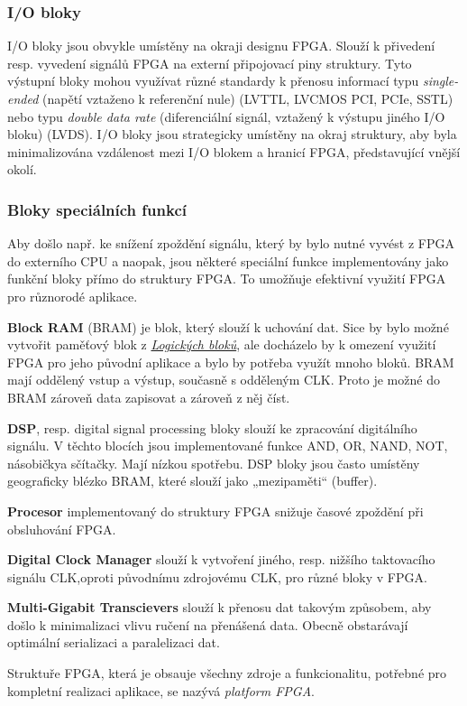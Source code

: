 \documentclass[a4paper, twoside, 11pt]{article}
\begin{document}
		\subsubsection{I/O bloky}
				I/O bloky jsou obvykle umístěny na okraji designu FPGA. Slouží k přivedení resp. vyvedení signálů FPGA na externí připojovací piny struktury. Tyto výstupní bloky mohou využívat různé standardy k přenosu informací typu \textit{single-ended} (napětí vztaženo k referenční nule) (LVTTL, LVCMOS PCI, PCIe, SSTL) nebo typu \textit{double data rate} (diferenciální signál, vztažený k výstupu jiného I/O bloku) (LVDS). I/O bloky jsou strategicky umístěny na okraj struktury, aby byla minimalizována vzdálenost mezi I/O blokem a hranicí FPGA, představující vnější okolí. \cite{Sass2010} \cite{pang-beginning-fpga}

		\subsubsection{Bloky speciálních funkcí}
			Aby došlo např. ke snížení zpoždění signálu, který by bylo nutné vyvést z FPGA do externího CPU a naopak, jsou některé speciální funkce implementovány jako funkční bloky přímo do struktury FPGA. To umožňuje efektivní využití FPGA pro různorodé aplikace. \cite{Sass2010}\par
			\textbf{Block RAM} (BRAM) je blok, který slouží k uchování dat. Sice by bylo možné vytvořit paměťový blok z \hyperref[subsubsec:logicke-bloky]{\textit{Logických bloků}}, ale docházelo by k omezení využití FPGA pro jeho původní aplikace a bylo by potřeba využít mnoho bloků. BRAM mají oddělený vstup a výstup, současně s odděleným CLK. Proto je možné do BRAM zároveň data zapisovat a zároveň z něj číst. \cite{Sass2010}\par
			\textbf{DSP}, resp. digital signal processing bloky slouží ke zpracování digitálního signálu. V těchto blocích jsou implementované funkce AND, OR, NAND, NOT, násobičkya sčítačky. Mají nízkou spotřebu. DSP bloky jsou často umístěny geograficky blézko BRAM, které slouží jako „mezipaměti“ (buffer). \cite{Sass2010}\par
			\textbf{Procesor} implementovaný do struktury FPGA snižuje časové zpoždění při obsluhování FPGA. \cite{Sass2010}\par
			\textbf{Digital Clock Manager} slouží k vytvoření jiného, resp. nižšího taktovacího signálu CLK,oproti původnímu zdrojovému CLK, pro různé bloky v FPGA. \cite{Sass2010}\par
			\textbf{Multi-Gigabit Transcievers} slouží k přenosu dat takovým způsobem, aby došlo k minimalizaci vlivu ručení na přenášená data. Obecně obstarávají optimální serializaci a paralelizaci dat. \cite{Sass2010}\par
			Struktuře FPGA, která je obsauje všechny zdroje a funkcionalitu, potřebné pro kompletní realizaci aplikace, se nazývá \textit{platform FPGA}.
\end{document}
